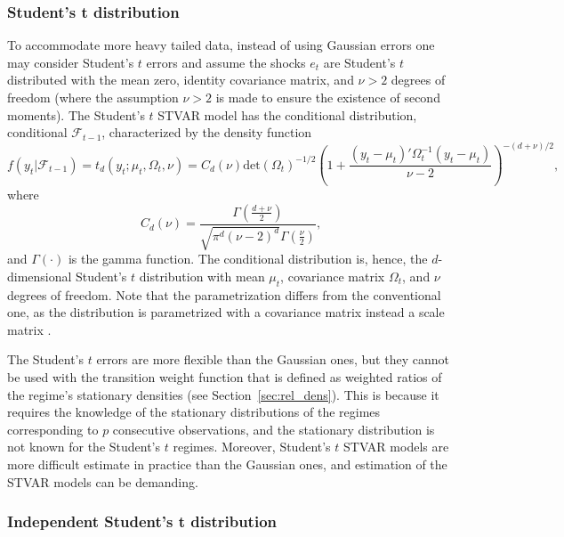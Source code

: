 \documentclass[nojss]{jss}
\begin{document}
\subsubsection{Student's t distribution}\label{sec:student}

To accommodate more heavy tailed data, instead of using Gaussian errors one may consider Student's $t$ errors and assume the shocks $e_t$ are Student's $t$ distributed with the mean zero, identity covariance matrix, and $\nu>2$ degrees of freedom (where the assumption $\nu>2$ is made to ensure the existence of second moments). The Student's $t$ STVAR model has the conditional distribution, conditional $\mathcal{F}_{t-1}$, characterized by the density function
\begin{equation}
f(y_t|\mathcal{F}_{t-1}) = t_d(y_t;\mu_t,\Omega_t,\nu)=C_d(\nu)\text{det}(\Omega_t)^{-1/2}\left(1+\frac{(y_t -\mu_t)'\Omega_t^{-1}(y_t - \mu_t)}{\nu-2}\right)^{-(d+\nu)/2},
\end{equation}
where
\begin{equation}
C_d(\nu)=\frac{\Gamma\left(\frac{d+\nu}{2}\right)}{\sqrt{\pi^d(\nu-2)^d}\Gamma\left(\frac{\nu}{2}\right)},
\end{equation}
and $\Gamma\left(\cdot\right)$ is the gamma function. The conditional distribution is, hence, the $d$-dimensional Student's $t$ distribution with mean $\mu_t$, covariance matrix $\Omega_t$, and $\nu$ degrees of freedom. Note that the parametrization differs from the conventional one, as the distribution is parametrized with a covariance matrix instead a scale matrix \cite[see, e.g.,][Appendix~A for details about the parametrization]{Meitz+Preve+Saikkonen:2023}.

The Student's $t$ errors are more flexible than the Gaussian ones, but they cannot be used with the transition weight function that is defined as weighted ratios of the regime's stationary densities (see Section~\ref{sec:rel_dens}). This is because it requires the knowledge of the stationary distributions of the regimes corresponding to $p$ consecutive observations, and the stationary distribution is not known for the Student's $t$ regimes. Moreover, Student's $t$ STVAR models are more difficult estimate in practice than the Gaussian ones, and estimation of the STVAR models can be demanding.

\subsubsection{Independent Student's t distribution}\label{sec:indstudent}
\end{document}
